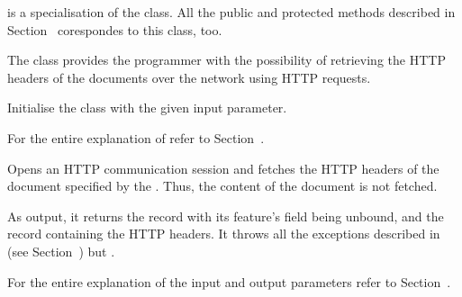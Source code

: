 \documentclass{ozdoc}
\begin{document}



 is a specialisation of the  class. All the public and protected methods described in Section~ corespondes to this class, too.

The  class provides the programmer with the possibility of retrieving the HTTP headers of the documents over the network using  HTTP requests. \mozartEMPTY
 \mozartEMPTY
\begin{mozartDESCRIPTION}
\mozartENTRYHASCODE
\begin{mozartSYNOPSIS}
\begin{mozartCODEDISPLAY}\mozartFACETEXT{)}\end{mozartCODEDISPLAY}
\end{mozartSYNOPSIS}
\mozartITEM Initialise the class with the given  input parameter.

  \mozartEMPTY
For the entire explanation of  refer to Section~. \mozartEMPTY
{}\mozartENTRYHASCODE
\begin{mozartSYNOPSIS}
\begin{mozartCODEDISPLAY}\mozartFACETEXT{\mozartSPACE{}}\mozartFACETEXT{\mozartSPACE{}}\mozartFACETEXT{)}\end{mozartCODEDISPLAY}
\end{mozartSYNOPSIS}
\mozartITEM Opens an HTTP communication session and fetches the HTTP headers of the document specified by the . Thus, the content of the document is not fetched.

As output, it returns the  record with its  feature's field being unbound, and the  record containing the HTTP headers. It throws all the exceptions described in (see Section~) but .

For the entire explanation of the input and output parameters refer to Section~. \mozartEMPTY
\end{mozartDESCRIPTION}
\end{document}
